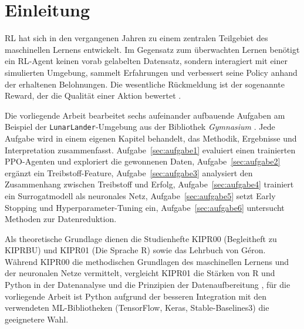 
\section*{Einleitung}
\label{sec:einleitung}

\ac{RL} hat sich in den vergangenen Jahren zu einem zentralen Teilgebiet des maschinellen Lernens entwickelt. Im Gegensatz zum überwachten Lernen benötigt ein \ac{RL}-Agent keinen vorab gelabelten Datensatz, sondern interagiert mit einer simulierten Umgebung, sammelt Erfahrungen und verbessert seine Policy anhand der erhaltenen Belohnungen. Die wesentliche Rückmeldung ist der sogenannte Reward, der die Qualität einer Aktion bewertet \cite[S.~12]{2}.

Die vorliegende Arbeit bearbeitet sechs aufeinander aufbauende Aufgaben am Beispiel der \texttt{LunarLander}-Umgebung aus der Bibliothek \emph{Gymnasium} \cite{4}. Jede Aufgabe wird in einem eigenen Kapitel behandelt, das Methodik, Ergebnisse und Interpretation zusammenfasst. Aufgabe~\ref{sec:aufgabe1} evaluiert einen trainierten \ac{PPO}-Agenten und exploriert die gewonnenen Daten, Aufgabe~\ref{sec:aufgabe2} ergänzt ein Treibstoff-Feature, Aufgabe~\ref{sec:aufgabe3} analysiert den Zusammenhang zwischen Treibstoff und Erfolg, Aufgabe~\ref{sec:aufgabe4} trainiert ein Surrogatmodell als neuronales Netz, Aufgabe~\ref{sec:aufgabe5} setzt Early Stopping und Hyperparameter-Tuning ein, Aufgabe~\ref{sec:aufgabe6} untersucht Methoden zur Datenreduktion.

Als theoretische Grundlage dienen die Studienhefte KIPR00 (Begleitheft zu KIPRBU) und KIPR01 (Die Sprache R) sowie das Lehrbuch von Géron. Während KIPR00 die methodischen Grundlagen des maschinellen Lernens und der neuronalen Netze vermittelt, vergleicht KIPR01 die Stärken von R und Python in der Datenanalyse und die Prinzipien der Datenaufbereitung \cite[S.~29--44]{3}, für die vorliegende Arbeit ist Python aufgrund der besseren Integration mit den verwendeten ML-Bibliotheken (TensorFlow, Keras, Stable-Baselines3) die geeignetere Wahl.

